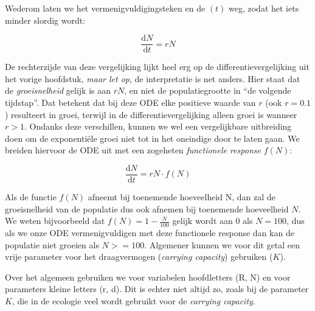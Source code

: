 \documentclass[
  a4paper,
]{scrbook}
\theoremstyle{definition}
\theoremstyle{remark}
\begin{document}
Wederom laten we het vermenigvuldigingsteken en de \((t)\) weg, zodat
het iets minder slordig wordt:

\begin{equation}
    \frac{\mathrm{d}N}{\mathrm{d}t} = rN
\end{equation}

De rechterzijde van deze vergelijking lijkt heel erg op de
differentievergelijking uit het vorige hoofdstuk, \emph{maar let op}, de
interpretatie is net anders. Hier staat dat de \emph{groeisnelheid}
gelijk is aan \(rN\), en niet de populatiegrootte in ``de volgende
tijdstap''. Dat betekent dat bij deze ODE elke positieve waarde van
\(r\) (ook \(r=0.1\)) resulteert in groei, terwijl in de
differentievergelijking alleen groei is wanneer \(r>1\). Ondanks deze
verschillen, kunnen we wel een vergelijkbare uitbreiding doen om de
exponentiële groei niet tot in het oneindige door te laten gaan. We
breiden hiervoor de ODE uit met een zogeheten \emph{functionele
response} \(f(N)\):

\begin{equation}
    \frac{\mathrm{d}N}{\mathrm{d}t} = rN \cdot f(N)
\end{equation}

Als de functie \(f(N)\) afneemt bij toenemende hoeveelheid N, dan zal de
groeisnelheid van de populatie dus ook afnemen bij toenemende
hoeveelheid \(N\). We weten bijvoorbeeld dat \(f(N)=1-\frac{N}{100}\)
gelijk wordt aan \(0\) als \(N=100\), dus als we onze ODE
vermenigvuldigen met deze functionele response dan kan de populatie niet
groeien als \(N>=100\). Algemener kunnen we voor dit getal een vrije
parameter voor het draagvermogen (\emph{carrying capacity}) gebruiken
(\(K\)).

\begin{tcolorbox}[enhanced jigsaw, coltitle=black, breakable, bottomtitle=1mm, opacityback=0, colback=white, rightrule=.15mm, title=\textcolor{quarto-callout-warning-color}{\faExclamationTriangle}\hspace{0.5em}{Parameters zijn vaak kleine letters, maar niet altijd}, bottomrule=.15mm, toprule=.15mm, left=2mm, colframe=quarto-callout-warning-color-frame, toptitle=1mm, opacitybacktitle=0.6, titlerule=0mm, colbacktitle=quarto-callout-warning-color!10!white, leftrule=.75mm, arc=.35mm]

Over het algemeen gebruiken we voor variabelen hoofdletters (R, N) en
voor parameters kleine letters (r, d). Dit is echter niet altijd zo,
zoals bij de parameter \(K\), die in de ecologie veel wordt gebruikt
voor de \emph{carrying capacity}.

\end{tcolorbox}
\end{document}
